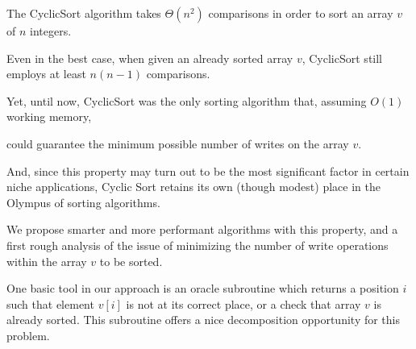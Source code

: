 
\noindent The {\sc CyclicSort} algorithm takes $\Theta(n^2)$ comparisons in order 
to sort an array $v$ of $n$ integers.

Even in the best case, when given an already sorted array $v$, {\sc 
CyclicSort} still employs at least $n(n-1)$ comparisons.

Yet, until now, {\sc CyclicSort} was the only sorting algorithm that, 
assuming $O(1)$ working memory,

could guarantee the minimum possible number of writes on the array $v$.

And, since this property may turn out to be the most significant factor 
in certain niche applications, {\sc Cyclic Sort} retains its own (though 
modest) place in the Olympus of sorting algorithms.

We propose smarter and more performant algorithms with this property, 
and a first rough analysis of the issue of minimizing the number of 
write operations within the array $v$ to be sorted.

One basic tool in our approach is an oracle subroutine which returns a 
position $i$ such that element $v[i]$ is not at its correct place, or a 
check that array $v$ is already sorted. This subroutine offers a nice 
decomposition opportunity for this problem.